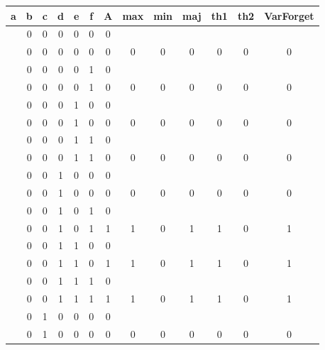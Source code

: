 \begin{table}[!tb]
    \centering
    \begin{tabular}{|c|c|c|c|c|c|c|c|c|c|c|c|c|}
        \hline
        \textbf{a} & \textbf{b} & \textbf{c} & \textbf{d} & \textbf{e} & \textbf{f} & \textbf{A} & \textbf{max} & \textbf{min} & \textbf{maj} & \textbf{th1} & \textbf{th2} & \textbf{VarForget} \\ \hline
        \rowcolor{gray!40}  & 0 & 0 & 0 & 0 & 0 & 0 &  &  &  &  &  &  \\ \hline
        \rowcolor{gray!40}  & 0 & 0 & 0 & 0 & 0 & 0 & 0 & 0 & 0 & 0 & 0 & 0 \\ \hline
        \rowcolor{blue!40}  & 0 & 0 & 0 & 0 & 1 & 0 &  &  &  &  &  &  \\ \hline
        \rowcolor{blue!40}  & 0 & 0 & 0 & 0 & 1 & 0 & 0 & 0 & 0 & 0 & 0 & 0 \\ \hline
        \rowcolor{red!40}  & 0 & 0 & 0 & 1 & 0 & 0 &  &  &  &  &  &  \\ \hline
        \rowcolor{red!40}  & 0 & 0 & 0 & 1 & 0 & 0 & 0 & 0 & 0 & 0 & 0 & 0 \\ \hline
        \rowcolor{green!40}  & 0 & 0 & 0 & 1 & 1 & 0 &  &  &  &  &  &  \\ \hline
        \rowcolor{green!40}  & 0 & 0 & 0 & 1 & 1 & 0 & 0 & 0 & 0 & 0 & 0 & 0 \\ \hline
        \rowcolor{yellow!40}  & 0 & 0 & 1 & 0 & 0 & 0 &  &  &  &  &  &  \\ \hline
        \rowcolor{yellow!40}  & 0 & 0 & 1 & 0 & 0 & 0 & 0 & 0 & 0 & 0 & 0 & 0 \\ \hline
        \rowcolor{gray!40}  & 0 & 0 & 1 & 0 & 1 & 0 &  &  &  &  &  &  \\ \hline
        \rowcolor{gray!40}  & 0 & 0 & 1 & 0 & 1 & 1 & 1 & 0 & 1 & 1 & 0 & 1 \\ \hline
        \rowcolor{blue!40}  & 0 & 0 & 1 & 1 & 0 & 0 &  &  &  &  &  &  \\ \hline
        \rowcolor{blue!40}  & 0 & 0 & 1 & 1 & 0 & 1 & 1 & 0 & 1 & 1 & 0 & 1 \\ \hline
        \rowcolor{red!40}  & 0 & 0 & 1 & 1 & 1 & 0 &  &  &  &  &  &  \\ \hline
        \rowcolor{red!40}  & 0 & 0 & 1 & 1 & 1 & 1 & 1 & 0 & 1 & 1 & 0 & 1 \\ \hline
        \rowcolor{green!40}  & 0 & 1 & 0 & 0 & 0 & 0 &  &  &  &  &  &  \\ \hline
        \rowcolor{green!40}  & 0 & 1 & 0 & 0 & 0 & 0 & 0 & 0 & 0 & 0 & 0 & 0 \\ \hline

\end{tabular}
\end{table}
